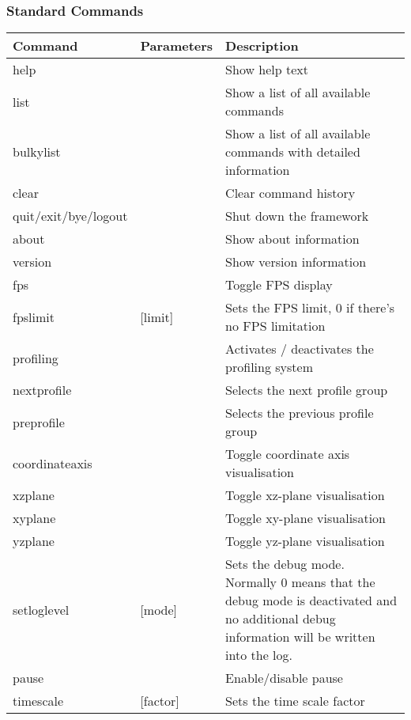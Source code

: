 \subsubsection{Standard Commands}
\begin{tabular}{|p{4cm}|p{2.4cm}|p{7.2cm}|}
\hline
\textbf{Command} & \textbf{Parameters} & \textbf{Description}\\
\hline
help                 &          & Show help text\\
\hline
list                 &          & Show a list of all available commands\\
\hline
bulkylist            &          & Show a list of all available commands with detailed information\\
\hline
clear                &          & Clear command history\\
\hline
quit/exit/bye/logout &          & Shut down the framework\\
\hline
about                &          & Show about information\\
\hline
version              &          & Show version information\\
\hline
fps                  &          & Toggle \ac{FPS} display\\
\hline
fpslimit             & [limit]  & Sets the \ac{FPS} limit, 0 if there's no \ac{FPS} limitation\\
\hline
profiling            &          & Activates / deactivates the profiling system\\
\hline
nextprofile          &          & Selects the next profile group\\
\hline
preprofile           &          & Selects the previous profile group\\
\hline
coordinateaxis       &          & Toggle coordinate axis visualisation\\
\hline
xzplane              &          & Toggle xz-plane visualisation\\
\hline
xyplane              &          & Toggle xy-plane visualisation\\
\hline
yzplane              &          & Toggle yz-plane visualisation\\
\hline
setloglevel          & [mode]   & Sets the debug mode. Normally 0 means that the debug mode is deactivated and no additional debug information will be written into the log.\\
\hline
pause                &          & Enable/disable pause\\
\hline
timescale            & [factor] & Sets the time scale factor\\
\hline
\end{tabular}




